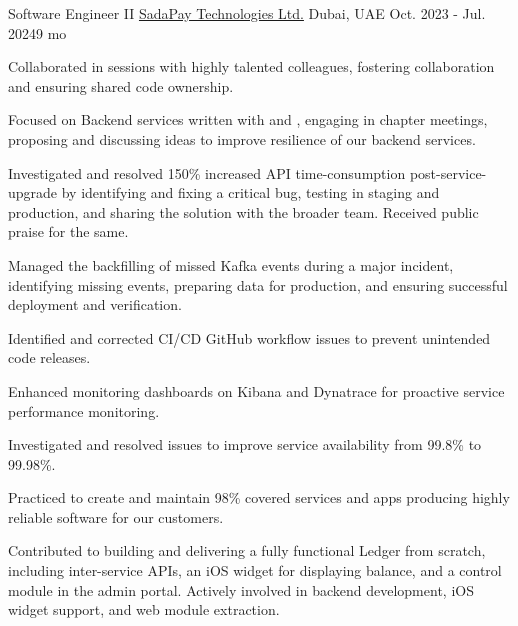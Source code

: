 

\begin{cventries}

  \cventry
  {Software Engineer II} %
  {\href{https://sadapay.pk/}{SadaPay Technologies Ltd.}} %
  {Dubai, UAE} %
  {Oct. 2023 - Jul. 2024{\enskip\cdotp\enskip}9 mo} %
  {
    \begin{cvitems} %
      \item {Collaborated in  sessions with highly talented colleagues, fostering collaboration and ensuring shared code ownership.}
      \item {Focused on Backend services written with  and , engaging in chapter meetings, proposing and discussing ideas to improve resilience of our backend services.}
      \item {Investigated and resolved 150\% increased API time-consumption post-service-upgrade by identifying and fixing a critical bug, testing in staging and production, and sharing the solution with the broader team. Received public praise for the same.}
      \item {Managed the backfilling of missed Kafka events during a major incident, identifying missing events, preparing data for production, and ensuring successful deployment and verification.}
      \item {Identified and corrected CI/CD GitHub workflow issues to prevent unintended code releases.}
      \item {Enhanced monitoring dashboards on Kibana and Dynatrace for proactive service performance monitoring.}
      \item {Investigated and resolved issues to improve service availability from 99.8\% to 99.98\%.}
      \item {Practiced  to create and maintain 98\% covered services and apps producing highly reliable software for our customers.}
      \item {Contributed to building and delivering a fully functional Ledger from scratch, including inter-service APIs, an iOS widget for displaying balance, and a control module in the admin portal. Actively involved in backend development, iOS widget support, and web module extraction.}

\end{cvitems}}
\end{cventries}
